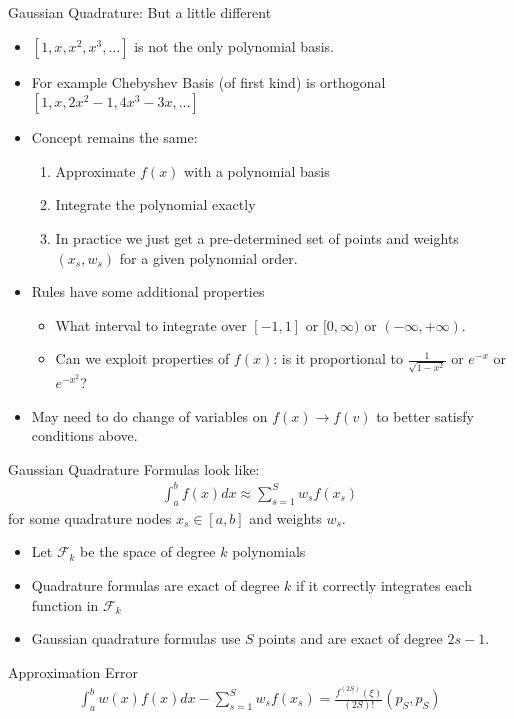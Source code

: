 \documentclass[xcolor=pdftex,dvipsnames,table,mathserif,aspectratio=169]{beamer}
\begin{document}
\begin{frame}{Gaussian Quadrature: But a little different}

\begin{itemize}
\item $[1,x,x^2,x^3,\ldots]$ is not the only \alert{polynomial basis}.
\item For example \alert{Chebyshev Basis} (of first kind) is \alert{orthogonal} $[1,x,2x^2-1,4x^3-3x,\ldots]$
\item Concept remains the same:
\begin{enumerate}
\item Approximate $f(x)$ with a polynomial basis
\item Integrate the polynomial exactly
\item In practice we just get a pre-determined set of points and weights $(x_s,w_s)$ for a given polynomial order.
\end{enumerate}
\item Rules have some additional properties
\begin{itemize}
\item What interval to integrate over $[-1,1]$ or $[0,\infty)$ or $(-\infty,+\infty)$.
\item Can we exploit properties of $f(x)$: is it proportional to $\frac{1}{\sqrt{1-x^2}}$ or $e^{-x}$ or $e^{-x^2}$?
\end{itemize}
\item May need to do change of variables on $f(x) \rightarrow f(v)$ to better satisfy conditions above.
\end{itemize}
\end{frame}


\begin{frame}{Gaussian Quadrature}
\small
Formulas look like:
\begin{eqnarray*}
\int_{a}^b f(x) d x \approx \sum_{s=1}^S  w_s f(x_s)
\end{eqnarray*}
for some quadrature nodes $x_s \in [a,b]$ and weights $w_s$.
\begin{itemize}
\item Let $\mathcal{F}_k$ be the space of degree $k$ polynomials
\item Quadrature formulas are exact of degree $k$ if it correctly integrates each function in $\mathcal{F}_k$
\item Gaussian quadrature formulas use $S$ points and are exact of degree $2s-1$.
\end{itemize}
Approximation Error
\begin{eqnarray*}
\int_a^b w(x) f(x)  dx - \sum_{s=1}^S w_s f(x_s) = \frac{f^{(2S)}(\xi)}{(2S)!} (p_S,p_S) 
\end{eqnarray*}
\end{frame}
\end{document}
